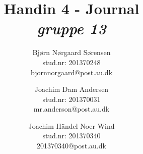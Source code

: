 

	\chead{\myTitle}	\rhead{\today}
\lfoot{}		\cfoot{}			\rfoot{\thepage}
\renewcommand{\headrulewidth}{1pt}
\renewcommand{\footrulewidth}{0pt}

\newcommand{\myTitle}{\textbf{Handin 4 - Journal}}
\newcommand{\mySubTitle}{\textit{gruppe 13}}

\title{\myTitle \\ \mySubTitle}
\author{
	Bjørn Nørgaard Sørensen\\
	stud.nr: 201370248\\
	bjornnorgaard@post.au.dk
	\and
	Joachim Dam Andersen\\
	stud.nr: 201370031\\
	mr.anderson@post.au.dk
	\and
	Joachim Händel Noer Wind\\
	stud.nr: 201370340\\
	201370340@post.au.dk
}


	\maketitle							%
		\newpage
	
	
	
	

